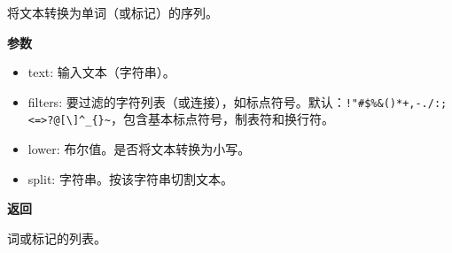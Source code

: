 将文本转换为单词（或标记）的序列。

\textbf{参数}

\begin{itemize}
\tightlist
\item
  text: 输入文本（字符串）。
\item
  filters:
  要过滤的字符列表（或连接），如标点符号。默认：\texttt{!"\#\$\%\&()*+,-./:;\textless{}=\textgreater{}?@{[}\textbackslash{}{]}\^{}\_\{\textbar{}\}\textasciitilde{}}，包含基本标点符号，制表符和换行符。
\item
  lower: 布尔值。是否将文本转换为小写。
\item
  split: 字符串。按该字符串切割文本。
\end{itemize}

\textbf{返回}

词或标记的列表。

\newpage
